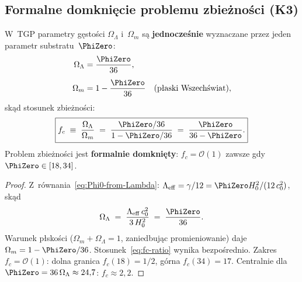 \subsection{Formalne domkni\k{e}cie problemu zbie\.zno\'sci (K3)}%
\label{ssec:de-k3}

\begin{proposition}\label{prop:K3-coincidence}
W~TGP parametry g\k{e}sto\'sci $\Omega_\Lambda$ i~$\Omega_m$
s\k{a} \textbf{jednocze\'snie} wyznaczane przez jeden parametr
substratu~$\PhiZero$:
\begin{align}
  \Omega_\Lambda
    &= \frac{\PhiZero}{36},
    \label{eq:OmLambda-from-Phi0}\\[4pt]
  \Omega_m
    &= 1 - \frac{\PhiZero}{36}
    \quad (\text{p\l{}aski Wszech\'swiat}),
    \label{eq:Omm-from-Phi0}
\end{align}
sk\k{a}d stosunek zbieżno\'sci:
\begin{equation}\label{eq:fc-ratio}
  \boxed{
    f_c \;\equiv\; \frac{\Omega_\Lambda}{\Omega_m}
    \;=\; \frac{\PhiZero/36}{1 - \PhiZero/36}
    \;=\; \frac{\PhiZero}{36 - \PhiZero}.
  }
\end{equation}
Problem zbie\.zno\'sci jest \textbf{formalnie domkni\k{e}ty}:
$f_c = \mathcal{O}(1)$ zawsze gdy $\PhiZero \in [18, 34]$.
\end{proposition}

\begin{proof}
Z~r\'ownania~\eqref{eq:Phi0-from-Lambda}:
$\Lambda_{\mathrm{eff}} = \gamma/12 = \PhiZero H_0^2/(12\,c_0^2)$,
sk\k{a}d
\[
  \Omega_\Lambda
  \;=\; \frac{\Lambda_{\mathrm{eff}}\,c_0^2}{3\,H_0^2}
  \;=\; \frac{\PhiZero}{36}.
\]
Warunek p\l{}sko\'sci ($\Omega_m + \Omega_\Lambda = 1$,
zaniedbuj\k{a}c promieniowanie) daje
$\Omega_m = 1 - \PhiZero/36$.
Stosunek~\eqref{eq:fc-ratio} wynika bezpo\'srednio.
Zakres $f_c = \mathcal{O}(1)$: dolna granica
$f_c(18) = 1/2$, g\'orna $f_c(34) = 17$.
Centralnie dla $\PhiZero = 36\,\Omega_\Lambda \approx 24{,}7$:
$f_c \approx 2{,}2$.
\end{proof}

